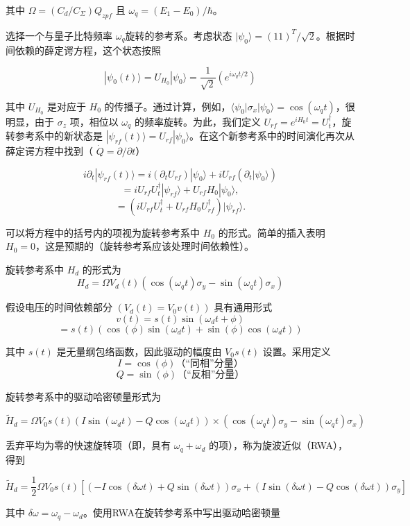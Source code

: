 其中 $\Omega = (C_d/C_\Sigma) Q_{zpf}$ 且 $\omega_q = (E_1 - E_0)/\hbar$。

选择一个与量子比特频率 $\omega_q$旋转的参考系。考虑状态 $|\psi_0\rangle = (1 1)^T/\sqrt{2}$。根据时间依赖的薛定谔方程，这个状态按照

\[
|\psi_0(t)\rangle = U_{H_0}|\psi_0\rangle = \frac{1}{\sqrt{2}} \left( e^{i\omega_q t/2} \right)
\]

其中 $U_{H_0}$ 是对应于 $H_0$ 的传播子。通过计算，例如，$\langle \psi_0|\sigma_x|\psi_0\rangle = \cos(\omega_q t)$，很明显，由于 $\sigma_z$ 项，相位以 $\omega_q$ 的频率旋转。为此，我们定义 $U_{rf} = e^{iH_0t} = U_t^{\dagger}$，旋转参考系中的新状态是 $|\psi_{rf}(t)\rangle = U_{rf}|\psi_0\rangle$。在这个新参考系中的时间演化再次从薛定谔方程中找到（ $\dot{Q} = \partial/\partial t$）

\[
i\partial_t |\psi_{rf}(t)\rangle = i(\partial_t U_{rf})|\psi_0\rangle + iU_{rf}(\partial_t|\psi_0\rangle)
\]
\[
= iU_{rf} U_t^{\dagger}|\psi_{rf}\rangle + U_{rf}H_0|\psi_0\rangle,
\]
\[
=(iU_{rf} U_t^{\dagger} + U_{rf}H_0U_{rf}^{\dagger})|\psi_{rf}\rangle.
\]

可以将方程中的括号内的项视为旋转参考系中 $H_0$ 的形式。简单的插入表明 $H_0 = 0$，这是预期的（旋转参考系应该处理时间依赖性）。

旋转参考系中 $H_d$ 的形式为
\[
H_d = \Omega V_d(t)(\cos(\omega_q t)\sigma_y - \sin(\omega_q t)\sigma_x)
\]

假设电压的时间依赖部分 $\left(V_d(t) = V_0 v(t)\right)$ 具有通用形式
\[
v(t) = s(t) \sin(\omega_d t + \phi)
\]
\[
= s(t) \left( \cos(\phi) \sin(\omega_d t) + \sin(\phi) \cos(\omega_d t) \right)
\]

其中 $s(t)$ 是无量纲包络函数，因此驱动的幅度由 $V_0 s(t)$ 设置。采用定义
\[
I = \cos(\phi) \text{（“同相”分量）}
\]
\[
Q = \sin(\phi) \text{（“反相”分量）}
\]

旋转参考系中的驱动哈密顿量形式为

\[
\tilde{H}_d =  \Omega V_0 s(t) \left( I \sin(\omega_d t) - Q \cos(\omega_d t) \right) \times \left( \cos(\omega_q t) \sigma_y - \sin(\omega_q t) \sigma_x \right)
\]

丢弃平均为零的快速旋转项（即，具有 $\omega_q + \omega_d$ 的项），称为旋波近似（RWA），得到

\[
\tilde{H}_d =  \frac{1}{2} \Omega V_0 s(t) \left[ \left( -I \cos(\delta \omega t) + Q \sin(\delta \omega t) \right) \sigma_x  + \left( I \sin(\delta \omega t) - Q \cos(\delta \omega t) \right) \sigma_y \right]
\]

其中 $\delta \omega = \omega_q - \omega_d$。使用RWA在旋转参考系中写出驱动哈密顿量

